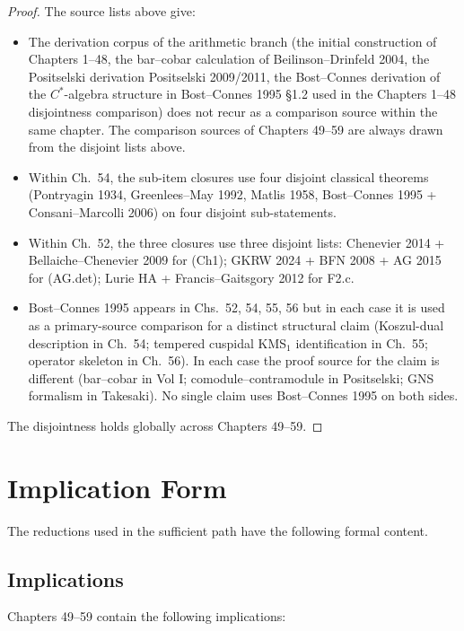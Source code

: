 \begin{proof}
The source lists above give:
\begin{itemize}
\item The derivation corpus of the arithmetic branch (the initial
construction of Chapters 1--48, the bar--cobar calculation of
Beilinson--Drinfeld 2004, the Positselski derivation
Positselski 2009/2011, the Bost--Connes derivation of the
\(C^{*}\)-algebra structure in Bost--Connes 1995 \S 1.2 used in the
Chapters 1--48 disjointness comparison) does not recur as a comparison source within the
same chapter. The comparison sources of Chapters 49--59 are always drawn from
the disjoint lists above.
\item Within Ch.~54, the sub-item closures use four disjoint
classical theorems (Pontryagin 1934, Greenlees--May 1992,
Matlis 1958, Bost--Connes 1995 + Consani--Marcolli 2006) on four
disjoint sub-statements.
\item Within Ch.~52, the three closures use three disjoint
lists: Chenevier 2014 + Bellaiche--Chenevier 2009 for (Ch1);
GKRW 2024 + BFN 2008 + AG 2015 for (AG.det); Lurie HA +
Francis--Gaitsgory 2012 for F2.c.
\item Bost--Connes 1995 appears in Chs.~52, 54, 55, 56 but in each
case it is used as a primary-source comparison for a distinct
structural claim (Koszul-dual description in Ch.~54;
tempered cuspidal KMS\({}_{1}\) identification in Ch.~55; operator
skeleton in Ch.~56). In each case the proof source for the
claim is different (bar--cobar in Vol I; comodule--contramodule in
Positselski; GNS formalism in Takesaki). No single claim uses
Bost--Connes 1995 on both sides.
\end{itemize}
The disjointness holds globally across Chapters 49--59.
\end{proof}

\section{Implication Form}
\label{v4-arith:w5-synth:form-table}

The reductions used in the sufficient path have the following formal
content.

\subsection{Implications}
\label{v4-arith:w5-synth:upgrades}

Chapters 49--59 contain the following implications:

